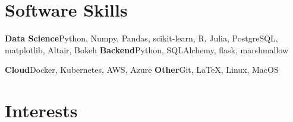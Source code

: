 \section{Software Skills}

\cvcomputer%
{\textbf{Data Science}}{Python, Numpy, Pandas, scikit-learn, R, Julia, PostgreSQL, matplotlib, Altair, Bokeh}
{\textbf{Backend}}{Python, SQLAlchemy, flask, marshmallow}

{\textbf{Cloud}}{Docker, Kubernetes, AWS, Azure}
{\textbf{Other}}{Git, \LaTeX, Linux, MacOS}

\section{Interests}

\vspace{2em}


